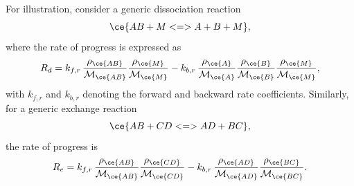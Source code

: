 For illustration, consider a generic dissociation reaction
\begin{equation}\label{equation:generic_diss}
    \ce{AB + M <=> A + B + M},
\end{equation}
where the rate of progress is expressed as
\begin{equation}
    R_d = k_{f,r} \,\frac{\rho_{\ce{AB}}}{\mathcal{M}_{\ce{AB}}}\frac{\rho_{\ce{M}}}{\mathcal{M}_{\ce{M}}}
           - k_{b,r}\,\frac{\rho_{\ce{A}}}{\mathcal{M}_{\ce{A}}}\frac{\rho_{\ce{B}}}{\mathcal{M}_{\ce{B}}}\frac{\rho_{\ce{M}}}{\mathcal{M}_{\ce{M}}},
\end{equation}
with $k_{f,r}$ and $k_{b,r}$ denoting the forward and backward rate coefficients. Similarly, for a generic exchange reaction
\begin{equation}
    \ce{AB + CD <=> AD + BC},
\end{equation}
the rate of progress is
\begin{equation}
    R_e = k_{f,r} \,\frac{\rho_{\ce{AB}}}{\mathcal{M}_{\ce{AB}}}\frac{\rho_{\ce{CD}}}{\mathcal{M}_{\ce{CD}}}
           - k_{b,r}\,\frac{\rho_{\ce{AD}}}{\mathcal{M}_{\ce{AD}}}\frac{\rho_{\ce{BC}}}{\mathcal{M}_{\ce{BC}}}.
\end{equation}

